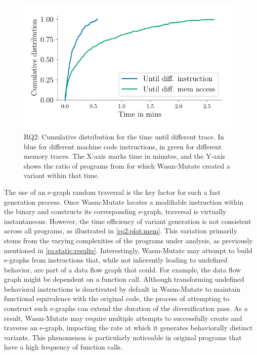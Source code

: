 \documentclass[a4paper,fleqn]{cas-dc}
\newcommand*\badge[1]{ \colorbox{red}{\color{white}#1}}
\newcommand{\tool}{{\sc Wasm-Mutate}\xspace}
\newcommand{\todo}[1]{%
\refstepcounter{todo}
\noindent\textbf{\badge{TODO}} {\color{red}#1}
\addcontentsline{td}{todo}
{\color{red}\thesection.\thetodo\xspace #1}}
\begin{document}
\begin{figure}
    \centering
    \includegraphics[width=\linewidth]{plots/rq2/oracle.cumulative.pdf}
    \caption{RQ2: Cumulative distribution for the time until different trace. In blue for different machine code instructions, in green for different memory traces. The X-axis marks time in minutes, and the Y-axis shows the ratio of programs from \nProgramsRosetta for which \tool created a variant within that time.}
  \label{rq2:plot:mem}
\end{figure}


The use of an e-graph random traversal is the key factor for such a fast generation process.
Once \tool locates a modifiable instruction within the binary and constructs its corresponding e-graph, traversal is virtually instantaneous. 
However, the time efficiency of variant generation is not consistent across all programs, as illustrated in \autoref{rq2:plot:mem}. 
This variation primarily stems from the varying complexities of the programs under analysis, as previously mentioned in \autoref{rq:static:results}.
Interestingly, \tool may attempt to build e-graphs from instructions that, while not inherently leading to undefined behavior, are part of a data flow graph that could. 
For example, the data flow graph might be dependent on a function call. 
Although transforming undefined behavioral instructions is deactivated by default in \tool to maintain functional equivalence with the original code, the process of attempting to construct such e-graphs can extend the duration of the diversification pass.
As a result, \tool may require multiple attempts to successfully create and traverse an e-graph, impacting the rate at which it generates behaviorally distinct variants. 
This phenomenon is particularly noticeable in original programs that have a high frequency of function calls.
\end{document}
